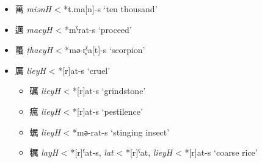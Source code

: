 \begin{itemize}
  \item {\Large{萬}} %
     \textit{miənH}
     < *t.ma[n]-s
     `ten thousand' %


  \item {\Large{邁}} %
    \textit{maeyH} < *mˁrat-s `proceed' 
    

  \item {\Large{蠆}} %
    \textit{ṭhaeyH}  < *mә-r̥ˁa[t]-s `scorpion' %

  \item {\Large{厲}} %
    \textit{lieyH} < *[r]at-s `cruel' %

\begin{itemize}
  \item {\Large{礪}} %
    \textit{lieyH} < *[r]at-s `grindstone' %


  \item {\Large{癘}} %
    \textit{lieyH} < *[r]at-s `pestilence' %


  \item {\Large{蠣}} %
    \textit{lieyH} < *mә-rat-s `stinging insect' %

  \item {\Large{糲}} %
    \textit{layH} < *[r]ˁat-s, \textit{lat} < *[r]ˁat, \textit{lieyH} 
    < *[r]at-s
    `coarse rice' %
\end{itemize}
\end{itemize}

